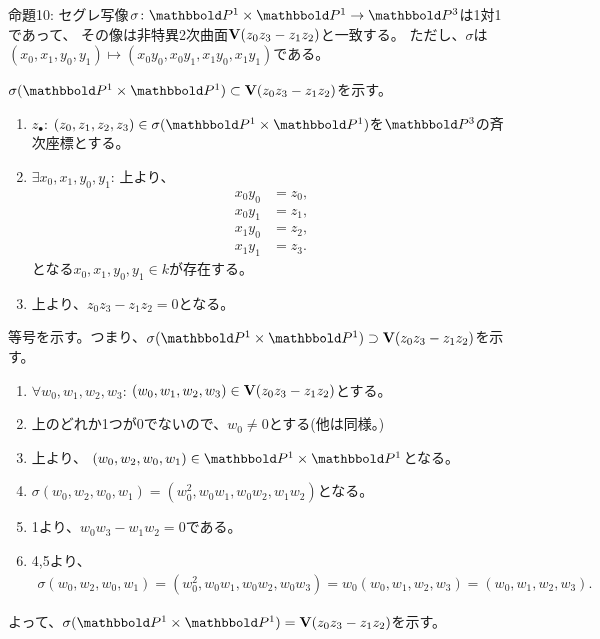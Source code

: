 \begin{framed}
  命題10:
  セグレ写像$\sigma\colon \P^1 \times \P^1 \to \P^3$は1対1であって、
  その像は非特異2次曲面$\textbf V(z_0z_3-z_1z_2)$と一致する。
  ただし、$\sigma$は$(x_0,x_1,y_0,y_1)\mapsto (x_0y_0,x_0y_1,x_1y_0,x_1y_1)$である。
\end{framed}
\begin{myproof}
  $\sigma(\P^1\times \P^1) \subset \var(z_0z_3-z_1z_2)$を示す。
  \begin{enumerate}
    \item
    $z_\bullet$: $(z_0,z_1,z_2,z_3)\in \sigma(\P^1\times \P^1)$を$\P^3$の斉次座標とする。
    \item $\exists x_0,x_1,y_0,y_1$:
    上より、
    \begin{align}
      x_0 y_0 &= z_0,\\
      x_0 y_1 &= z_1,\\
      x_1 y_0 &= z_2,\\
      x_1 y_1 &= z_3.
    \end{align}
    となる$x_0,x_1,y_0,y_1\in k$が存在する。
    \item
    上より、$z_0z_3-z_1 z_2 = 0$となる。
  \end{enumerate}

  等号を示す。つまり、$\sigma(\P^1\times \P^1) \supset \var(z_0z_3-z_1z_2)$を示す。
  \begin{enumerate}
    \item $\forall w_0,w_1,w_2,w_3$:
    $(w_0,w_1,w_2,w_3) \in \textbf V(z_0z_3-z_1z_2)$とする。
    \item 上のどれか1つが0でないので、$w_0\neq 0$とする(他は同様。)
    \item 上より、
    $(w_0,w_2,w_0,w_1) \in \P^1\times \P^1$となる。
    \item
    $\sigma(w_0,w_2,w_0,w_1) = (w_0^2,w_0w_1,w_0w_2,w_1w_2)$となる。
    \item
    1より、$w_0w_3-w_1w_2 = 0$である。
    \item
    4,5より、
    \begin{align}
      \sigma(w_0,w_2,w_0,w_1)
      =
      (w_0^2,w_0w_1,w_0w_2,w_0w_3)
      =
      w_0(w_0,w_1,w_2,w_3)
      =
      (w_0,w_1,w_2,w_3).
    \end{align}
  \end{enumerate}

  よって、$\sigma(\P^1\times \P^1) = \var(z_0z_3-z_1z_2)$を示す。
\end{myproof}

